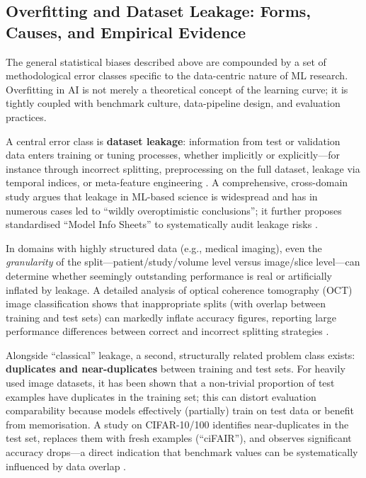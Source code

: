 \documentclass[12pt, a4paper]{article}
\begin{document}
\subsection{Overfitting and Dataset Leakage: Forms, Causes, and
            Empirical Evidence}
\label{sec:leakage}

The general statistical biases described above are compounded by a set
of methodological error classes specific to the data-centric nature of
ML research.  Overfitting in AI is not merely a theoretical concept of
the learning curve; it is tightly coupled with benchmark culture,
data-pipeline design, and evaluation practices.

A central error class is \textbf{dataset leakage}: information from test
or validation data enters training or tuning processes, whether
implicitly or explicitly---for instance through incorrect splitting,
preprocessing on the full dataset, leakage via temporal indices, or
meta-feature engineering \cite{Kapoor2023}.  A comprehensive,
cross-domain study argues that leakage in ML-based science is
widespread and has in numerous cases led to ``wildly overoptimistic
conclusions''; it further proposes standardised ``Model Info Sheets'' to
systematically audit leakage risks \cite{Kapoor2023}.

In domains with highly structured data (e.g., medical imaging), even the
\emph{granularity} of the split---patient/study/volume level versus
image/slice level---can determine whether seemingly outstanding
performance is real or artificially inflated by leakage.  A detailed
analysis of optical coherence tomography (OCT) image classification
shows that inappropriate splits (with overlap between training and test
sets) can markedly inflate accuracy figures, reporting large performance
differences between correct and incorrect splitting strategies
\cite{Tampu2022}.

Alongside ``classical'' leakage, a second, structurally related problem
class exists: \textbf{duplicates and near-duplicates} between training
and test sets.  For heavily used image datasets, it has been shown that
a non-trivial proportion of test examples have duplicates in the
training set; this can distort evaluation comparability because models
effectively (partially) train on test data or benefit from memorisation.
A study on CIFAR-10/100 identifies near-duplicates in the test set,
replaces them with fresh examples (``ciFAIR''), and observes significant
accuracy drops---a direct indication that benchmark values can be
systematically influenced by data overlap \cite{Barz2020}.
\end{document}
